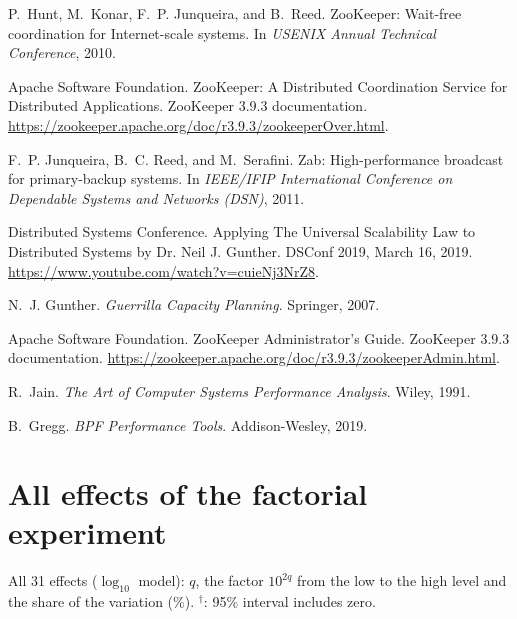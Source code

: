 \documentclass{llncs}
\begin{document}
\begin{thebibliography}{10}

P.~Hunt, M.~Konar, F.~P. Junqueira, and B.~Reed.
\newblock ZooKeeper: Wait-free coordination for Internet-scale systems.
\newblock In \emph{USENIX Annual Technical Conference}, 2010.

Apache Software Foundation.
\newblock ZooKeeper: A Distributed Coordination Service for Distributed Applications.
\newblock ZooKeeper 3.9.3 documentation.
\newblock \url{https://zookeeper.apache.org/doc/r3.9.3/zookeeperOver.html}.

F.~P. Junqueira, B.~C. Reed, and M.~Serafini.
\newblock Zab: High-performance broadcast for primary-backup systems.
\newblock In \emph{IEEE/IFIP International Conference on Dependable Systems and Networks (DSN)}, 2011.

Distributed Systems Conference.
\newblock Applying The Universal Scalability Law to Distributed Systems by Dr. Neil J. Gunther.
\newblock DSConf 2019, March 16, 2019.
\newblock \url{https://www.youtube.com/watch?v=cuieNj3NrZ8}.

N.~J. Gunther.
\newblock \emph{Guerrilla Capacity Planning}.
\newblock Springer, 2007.

Apache Software Foundation.
\newblock ZooKeeper Administrator's Guide.
\newblock ZooKeeper 3.9.3 documentation.
\newblock \url{https://zookeeper.apache.org/doc/r3.9.3/zookeeperAdmin.html}.

R.~Jain.
\newblock \emph{The Art of Computer Systems Performance Analysis}.
\newblock Wiley, 1991.

B.~Gregg.
\newblock \emph{BPF Performance Tools}.
\newblock Addison-Wesley, 2019.

\end{thebibliography}

\appendix

\section{All effects of the factorial experiment}
\label{app:effects}

\begin{table}[H]
  \centering
  \caption{All 31 effects ($\log_{10}$ model): $q$, the factor $10^{2q}$ from the low to the high level and the share of
    the variation (\%). $^\dagger$: 95\% interval includes zero.}
  \label{tab:effectsall}
  \scriptsize
  
\end{table}
\end{document}
